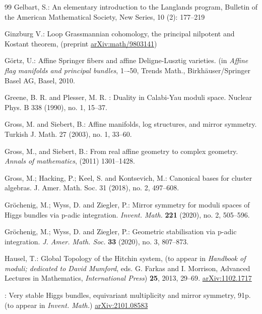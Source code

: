 \documentclass[12pt]{article}
\numberwithin{equation}{section}
\theoremstyle{remark}
\numberwithin{theorem}{section}
\numberwithin{equation}{section}
\begin{document}
\begin{thebibliography}{99}
	Gelbart, S.: An elementary introduction to the Langlands program, Bulletin of the American Mathematical Society, New Series, 10 (2): 177--219
	
	 { Ginzburg	V.}: Loop Grassmannian cohomology, the principal nilpotent and Kostant theorem, (preprint \href{https://arxiv.org/abs/math/9803141}{arXiv:math/9803141})
	
	 G\"ortz, U.:
Affine Springer fibers and affine Deligne-Lusztig varieties. (in {\em Affine flag manifolds and principal bundles}, 1–-50,
Trends Math., Birkhäuser/Springer Basel AG, Basel, 2010.
	
	 Greene, B. R. {\rm and} Plesser, M. R. : Duality in Calabi-Yau moduli space.
Nuclear Phys. B 338 (1990), no. 1, 15–37.
	
	Gross, M. {\rm and} Siebert, B.:
Affine manifolds, log structures, and mirror symmetry. Turkish J. Math. 27 (2003), no. 1, 33–60.
	
	 Gross, M., and Siebert, B.:
 From real affine geometry to complex geometry. {\em Annals of mathematics}, (2011) 1301--1428.
	
 Gross, M.; Hacking, P.; Keel, S. {\rm and} Kontsevich, M.:
Canonical bases for cluster algebras.
J. Amer. Math. Soc. 31 (2018), no. 2, 497–608.
	
		{ Gr\"ochenig, M.; Wyss, D. {\rm and} Ziegler, P.}:
	Mirror symmetry for moduli spaces of Higgs bundles via p-adic integration. 
	{\em Invent. Math. }{\bf 221 }(2020), no. 2, 505--596.	
	
		{ Gr\"ochenig, M.; Wyss, D. {\rm and} Ziegler, P.}:
	Geometric stabilisation via p-adic integration.
	{\em	J. Amer. Math. Soc.} {\bf 33 } (2020), no. 3, 807--873.
	
	 { Hausel, T.}: Global Topology of the Hitchin system, (to appear in {\em Handbook of moduli; dedicated to David Mumford}, eds. G. Farkas and I. Morrison, Advanced Lectures in Mathematics, {\em International Press})  {\bf 25}, 2013, {29--69}. \href{https://arxiv.org/abs/1102.1717}{arXiv:1102.1717}
	
	: Very stable Higgs bundles, equivariant multiplicity and mirror symmetry, 91p. (to appear in {\em Invent. Math.})  \href{https://arxiv.org/abs/2101.08583}{arXiv:2101.08583}
	

\end{thebibliography}
\end{document}
